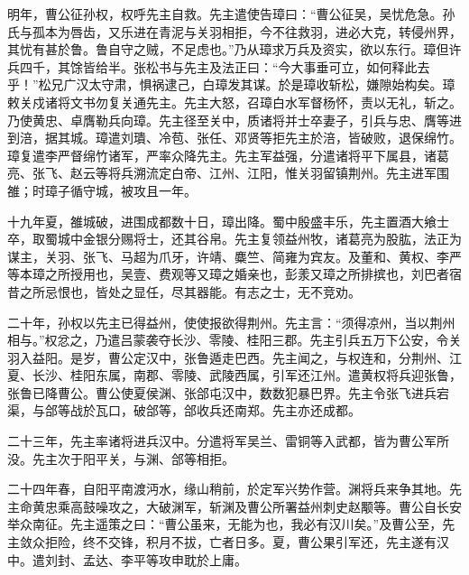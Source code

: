 \documentclass[12pt,UTF8]{ctexbook}
\begin{document}
明年，曹公征孙权，权呼先主自救。先主遣使告璋曰：“曹公征吴，吴忧危急。孙氏与孤本为唇齿，又乐进在青泥与关羽相拒，今不往救羽，进必大克，转侵州界，其忧有甚於鲁。鲁自守之贼，不足虑也。”乃从璋求万兵及资实，欲以东行。璋但许兵四千，其馀皆给半。张松书与先主及法正曰：“今大事垂可立，如何释此去乎！”松兄广汉太守肃，惧祸逮己，白璋发其谋。於是璋收斩松，嫌隙始构矣。璋敕关戍诸将文书勿复关通先主。先主大怒，召璋白水军督杨怀，责以无礼，斩之。乃使黄忠、卓膺勒兵向璋。先主径至关中，质诸将并士卒妻子，引兵与忠、膺等进到涪，据其城。璋遣刘璝、冷苞、张任、邓贤等拒先主於涪，皆破败，退保绵竹。璋复遣李严督绵竹诸军，严率众降先主。先主军益强，分遣诸将平下属县，诸葛亮、张飞、赵云等将兵溯流定白帝、江州、江阳，惟关羽留镇荆州。先主进军围雒；时璋子循守城，被攻且一年。

十九年夏，雒城破，进围成都数十日，璋出降。蜀中殷盛丰乐，先主置酒大飨士卒，取蜀城中金银分赐将士，还其谷帛。先主复领益州牧，诸葛亮为股肱，法正为谋主，关羽、张飞、马超为爪牙，许靖、麋竺、简雍为宾友。及董和、黄权、李严等本璋之所授用也，吴壹、费观等又璋之婚亲也，彭羕又璋之所排摈也，刘巴者宿昔之所忌恨也，皆处之显任，尽其器能。有志之士，无不竞劝。

二十年，孙权以先主已得益州，使使报欲得荆州。先主言：“须得凉州，当以荆州相与。”权忿之，乃遣吕蒙袭夺长沙、零陵、桂阳三郡。先主引兵五万下公安，令关羽入益阳。是岁，曹公定汉中，张鲁遁走巴西。先主闻之，与权连和，分荆州、江夏、长沙、桂阳东属，南郡、零陵、武陵西属，引军还江州。遣黄权将兵迎张鲁，张鲁已降曹公。曹公使夏侯渊、张郃屯汉中，数数犯暴巴界。先主令张飞进兵宕渠，与郃等战於瓦口，破郃等，郃收兵还南郑。先主亦还成都。

二十三年，先主率诸将进兵汉中。分遣将军吴兰、雷铜等入武都，皆为曹公军所没。先主次于阳平关，与渊、郃等相拒。

二十四年春，自阳平南渡沔水，缘山稍前，於定军兴势作营。渊将兵来争其地。先主命黄忠乘高鼓噪攻之，大破渊军，斩渊及曹公所署益州刺史赵颙等。曹公自长安举众南征。先主遥策之曰：“曹公虽来，无能为也，我必有汉川矣。”及曹公至，先主敛众拒险，终不交锋，积月不拔，亡者日多。夏，曹公果引军还，先主遂有汉中。遣刘封、孟达、李平等攻申耽於上庸。
\end{document}
